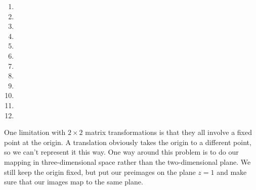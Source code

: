 \documentclass[../gatm.tex]{subfiles}
\begin{document}
\begin{enumerate}
\begin{multicols}{4}
\begin{enumerate}
\item {}
\item {}
\item {}
\item {}
\item {}
\item {}
\item {}
\item {}
\item {}
\item {}
\item {}
\item {}
\end{enumerate}
\end{multicols}
\setcounter{mp_problem_i}{\value{enumi}}
\end{enumerate}

One limitation with $2\times 2$ matrix transformations is that they all involve a fixed point at the origin. A translation obviously takes the origin to a different point, so we can't represent it this way. One way around this problem is to do our mapping in three-dimensional space rather than the two-dimensional plane. We still keep the origin fixed, but put our preimages on the plane $z=1$ and make sure that our images map to the same plane.
\end{document}
